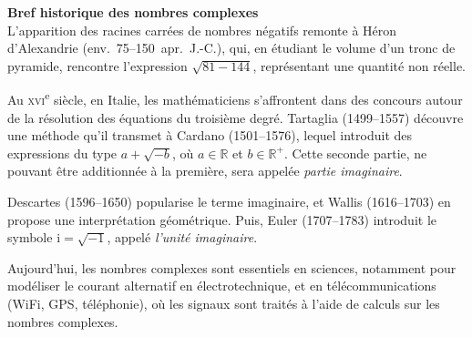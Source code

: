 
\everymath{\displaystyle}

\textbf{Bref historique des nombres complexes}\\
L’apparition des racines carrées de nombres négatifs remonte à Héron d’Alexandrie (env.~75--150~apr.~J.-C.), qui, en étudiant le volume d’un tronc de pyramide, rencontre l’expression $ \sqrt{81 - 144} $, représentant une quantité non réelle.

Au \textsc{xvi}\textsuperscript{e} siècle, en Italie, les mathématiciens s’affrontent dans des concours autour de la résolution des équations du troisième degré. Tartaglia (1499--1557) découvre une méthode qu’il transmet à Cardano (1501--1576), lequel introduit des expressions du type $ a + \sqrt{-b} $, où $a \in \mathbb{R}$ et $b \in \mathbb{R}^+$. Cette seconde partie, ne pouvant être additionnée à la première, sera appelée \textit{partie imaginaire}.

Descartes (1596--1650) popularise le terme \og imaginaire\fg{}, et Wallis (1616--1703) en propose une interprétation géométrique. Puis, Euler (1707--1783) introduit le symbole $ \text{i} = \sqrt{-1} $, appelé \textit{l’unité imaginaire}.

\medskip

Aujourd’hui, les nombres complexes sont essentiels en sciences, notamment pour modéliser le courant alternatif en électrotechnique, et en télécommunications (WiFi, GPS, téléphonie), où les signaux sont traités à l’aide de calculs sur les nombres complexes.

